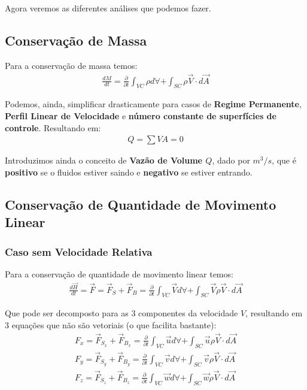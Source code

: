 \documentclass{article}
\newcommand{\n}{\nonumber \\ }
\begin{document}
        Agora veremos as diferentes análises que podemos fazer.

    \subsection{Conservação de Massa}
        Para a conservação de massa temos:
        \begin{align}
            \frac{dM}{dt} = \frac{\partial}{\partial t} \int_{VC} \rho d\forall + \int_{SC}\rho \vec V \cdot d \vec A
        \end{align}

        Podemos, ainda, simplificar drasticamente para casos de \textbf{Regime Permanente}, \textbf{Perfil Linear de Velocidade} e \textbf{número constante de superfícies de controle}. Resultando em:
        \begin{align}
            Q =  \sum V A = 0
        \end{align}

        Introduzimos ainda o conceito de \textbf{Vazão de Volume $Q$}, dado por $m^3/s$, que é \textbf{positivo} se o fluidos estiver saindo e \textbf{negativo} se estiver entrando.

    \subsection{Conservação de Quantidade de Movimento Linear}
        \subsubsection{Caso sem Velocidade Relativa}
            Para a conservação de quantidade de movimento linear temos:
            \begin{align}
                \frac{d \vec H}{dt} = \vec F = \vec F_S + \vec F_B = \frac{\partial}{\partial t} \int_{VC} \vec V d\forall + \int_{SC}\vec V \rho \vec V \cdot d \vec A
            \end{align}

            Que pode ser decomposto para as 3 componentes da velocidade $V$, resultando em 3 equações que não são vetoriais (o que facilita bastante):
            \begin{align}
                F_x = \vec F_{S_x} + \vec F_{B_x} = \frac{\partial}{\partial t} \int_{VC} \vec u d\forall + \int_{SC}\vec u \rho \vec V \cdot d \vec A \n
                F_y = \vec F_{S_y} + \vec F_{B_y} = \frac{\partial}{\partial t} \int_{VC} \vec v d\forall + \int_{SC}\vec v \rho \vec V \cdot d \vec A \n
                F_z = \vec F_{S_z} + \vec F_{B_z} = \frac{\partial}{\partial t} \int_{VC} \vec w d\forall + \int_{SC}\vec w \rho \vec V \cdot d \vec A
                \label{eq:cons_quan_movi_lin}
            \end{align}
\end{document}
